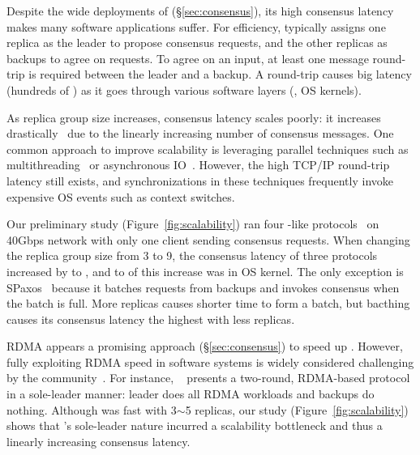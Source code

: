 Despite the wide deployments of \paxos (\S\ref{sec:consensus}), its high 
consensus latency makes many software applications suffer. For efficiency, 
\paxos typically assigns one replica as the leader to propose consensus 
requests, and the other replicas as backups to agree on requests. To 
agree on an input, at least one message round-trip is required between the 
leader and a backup. A round-trip causes big latency (hundreds of \us) as it 
goes through various software layers (\eg, OS kernels).


As replica group size increases, \paxos consensus latency scales poorly: it increases
drastically~\cite{scatter:sosp11} due to the linearly increasing number of 
consensus messages. One common approach to improve \paxos scalability is 
leveraging parallel techniques such as multithreading~\cite{zookeeper, 
spaxos:srds12} or asynchronous IO~\cite{crane:sosp15, libpaxos}. However, the 
high TCP/IP round-trip latency still exists, and synchronizations in these 
techniques frequently invoke expensive OS events such as context switches.

Our preliminary study (Figure~\ref{fig:scalability}) ran four \paxos-like 
protocols~\cite{zookeeper, spaxos:srds12, crane:sosp15, libpaxos} on 40Gbps 
network with only one client sending consensus requests. When changing the 
replica group size from 3 to 9, the consensus latency of three protocols 
increased by \tradlatencyincreaselow to \tradlatencyincreasehigh, and 
\systemcostlow to \systemcosthigh of this increase was in OS kernel. The only
exception is S\-Paxos~\cite{spaxos:srds12} because it batches requests from backups
and invokes consensus when the batch is full. More replicas causes shorter time
to form a batch, but bacthing causes its consensus latency the highest with
less replicas.

RDMA appears a promising approach (\S\ref{sec:consensus}) to speed up \paxos. 
However, fully exploiting RDMA speed in software systems is widely considered 
challenging by the community~\cite{pilaf:usenix14,herd:sigcomm14,
farm:sosp15,dare:hpdc15}. For instance, \dare~\cite{dare:hpdc15} presents a
two-round, RDMA-based \paxos protocol in a sole-leader manner: leader does all 
RDMA workloads and backups do nothing. Although \dare was fast with 3$\sim$5 
replicas, our study (Figure~\ref{fig:scalability}) shows that \dare's sole-leader
nature incurred a scalability bottleneck and thus a linearly increasing consensus latency.

